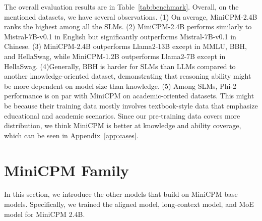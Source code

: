 The overall evaluation results are in Table~\ref{tab:benchmark}. Overall, on the mentioned datasets, we have several observations. (1) On average, MiniCPM-2.4B ranks the highest among all the SLMs. (2) MiniCPM-2.4B performs similarly to Mistral-7B-v0.1 in English but significantly outperforms Mistral-7B-v0.1 in Chinese. (3) MiniCPM-2.4B outperforms Llama2-13B except in MMLU, BBH, and HellaSwag, while MiniCPM-1.2B outperforms Llama2-7B except in HellaSwag. (4)Generally, BBH is harder for SLMs than LLMs compared to another knowledge-oriented dataset, demonstrating that reasoning ability might be more dependent on model size than knowledge. (5) Among SLMs, Phi-2 performance is on par with MiniCPM on academic-oriented datasets. This might be because their training data mostly involves textbook-style data that emphasize educational and academic scenarios. Since our pre-training data covers more distribution, we think MiniCPM is better at knowledge and ability coverage, which can be seen in Appendix~\ref{app:cases}.




\section{MiniCPM Family}
In this section, we introduce the other models that build on MiniCPM base models. Specifically, we trained the aligned model, long-context model, and MoE model for MiniCPM 2.4B.






